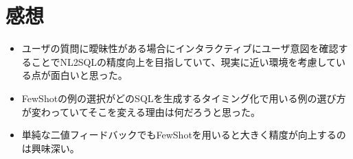 \documentclass[dvipdfmx,uplatex]{jsarticle}
\theoremstyle{remark}
\newenvironment{kansou}{
    \begin{tcolorbox}[
        colframe=brown,
        colback=brown!10!white,
        colbacktitle=brown!40!white,
        coltitle=black,fonttitle=\bfseries
    ]
}{
    \end{tcolorbox}
}
\begin{document}
\section{感想}
\begin{kansou}
\begin{itemize}
  \item ユーザの質問に曖昧性がある場合にインタラクティブにユーザ意図を確認することでNL2SQLの精度向上を目指していて、現実に近い環境を考慮している点が面白いと思った。
  \item FewShotの例の選択がどのSQLを生成するタイミング化で用いる例の選び方が変わっていてそこを変える理由は何だろうと思った。
  \item 単純な二値フィードバックでもFewShotを用いると大きく精度が向上するのは興味深い。
\end{itemize}
\end{kansou}
% 
% 
\end{document}
